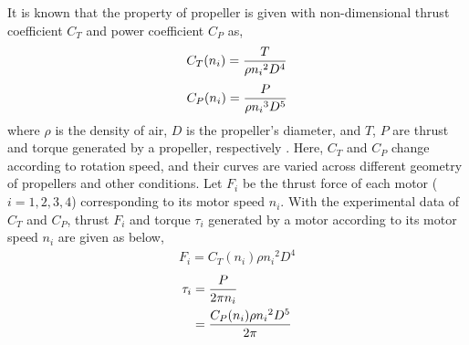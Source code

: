 It is known that the property of propeller is given with non-dimensional thrust coefficient \(C_T\) and power coefficient \(C_P\) as, \\
\begin{equation}
\begin{aligned}
C_T (n_i) ={ T \over { \rho {n_i}^2 D^4}}
\end{aligned}
\end{equation}
\begin{equation}
\begin{aligned}
C_P (n_i) = {P \over { \rho {n_i}^3 D^5}}
\end{aligned}
\end{equation}
where \(\rho\) is the density of air, \(D\) is the propeller's diameter, and \(T\), \(P\) are thrust and torque generated by a propeller, respectively \cite{airfoil2}. Here, \(C_T\) and \(C_P\) change according to rotation speed, and their curves are varied across different geometry of propellers and other conditions. Let \(F_i \) be the thrust force of each motor (\( i = 1, 2, 3, 4 \)) corresponding to its motor speed \( n_i\). With the experimental data of \(C_T\) and \(C_P\), thrust \( F_i\) and torque \(\tau_i\) generated by a motor according to its motor speed \( n_i\) are given as below,\\
\begin{equation}
\begin{aligned}
F_i = C_T (n_i) \rho {n_i}^2 D^4
\end{aligned}
\end{equation}
\begin{equation}
\begin{aligned}
\tau_i & = {P \over {2 \pi n_i}} \\ 
& = {C_P (n_i) \rho {n_i}^2 D^5 \over {2 \pi}}
\end{aligned}
\end{equation}


